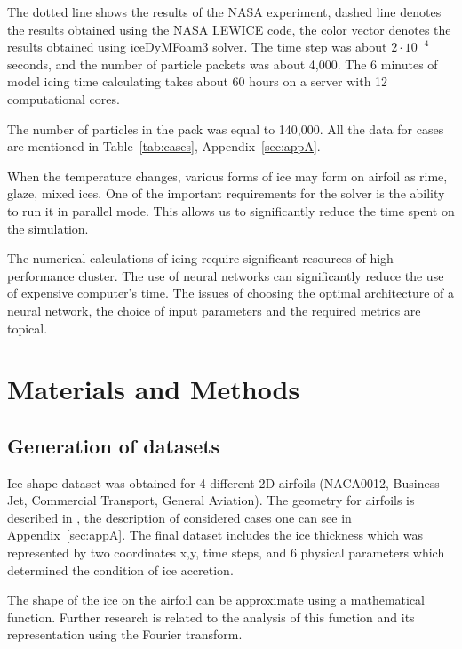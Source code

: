 \documentclass[aerospace,article,submit,moreauthors,pdftex]{Definitions/mdpi}
\begin{document}
The dotted line shows the results of the NASA experiment, dashed line denotes the results obtained using the NASA LEWICE code, the color vector denotes the results obtained using iceDyMFoam3 solver. The time step was about $2 \cdot 10^{-4}$ seconds, and the number of particle packets was about 4,000. The 6 minutes of model icing time calculating  takes about 60 hours on a server with 12 computational cores. 

The number of particles in the pack was equal to 140,000. All the data for cases are mentioned in Table~\ref{tab:cases}, Appendix~\ref{sec:appA}. 

When the temperature changes, various forms of ice may form on airfoil as rime, glaze, mixed ices. One of the important requirements for the solver is the ability to run it in parallel mode. This allows us to significantly reduce the time spent on the simulation.

The numerical calculations of icing require significant resources of high-performance cluster. The use of neural networks can significantly reduce the use of expensive computer's time. The issues of choosing the optimal architecture of a neural network, the choice of input parameters and the required metrics are topical. 


\section{Materials and Methods \label{sec:materialsAndMethods}}

\subsection{Generation of datasets}

Ice shape dataset was obtained for 4 different 2D airfoils (NACA0012, Business Jet, Commercial Transport, General Aviation). The geometry for airfoils is described in \cite{SHINBOND1992,Addy2000IceAA}, the description of considered cases one can see in Appendix~\ref{sec:appA}. %
The final dataset includes the ice thickness which was represented by two coordinates x,y, time steps, and 6 physical parameters which determined the condition of ice accretion.

The shape of the ice on the airfoil can be approximate using a mathematical function. Further research is related to the analysis of this function and its representation using the Fourier transform. 
\end{document}
